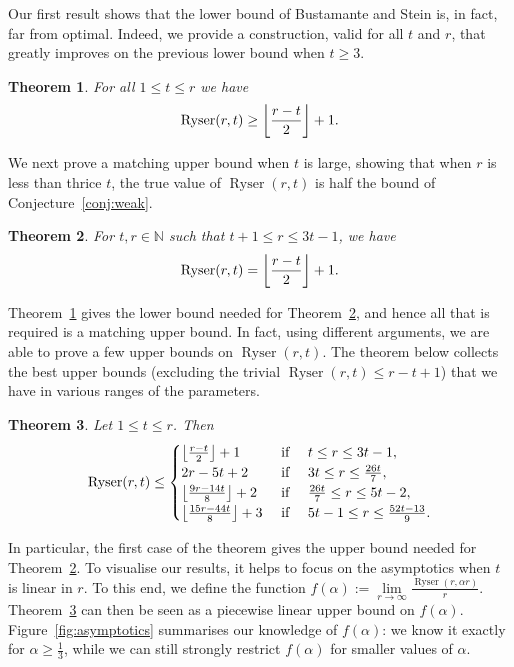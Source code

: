 \documentclass[a4paper,twoside,11pt]{article}
\DeclarePairedDelimiter{\floor}{\lfloor}{\rfloor}
\newtheorem{thm}{Theorem}
\numberwithin{thm}{section}
\theoremstyle{definition}
\theoremstyle{remark}
\theoremstyle{definition}
\DeclareMathOperator{\Ryser}{Ryser}
\begin{document}
Our first result shows that the lower bound of Bustamante and Stein is, in fact, far from optimal. Indeed, we provide a construction, valid for all $t$ and $r$, that greatly improves on the previous lower bound when $t\geq 3$.

\begin{thm} \label{thm:lowerbound}
For all $1 \le t \le r$ we have 
\[\Ryser(r,t)\geq \floor*{\frac{r-t}{2}}+1.\]
\end{thm}

We next prove a matching upper bound when $t$ is large, showing that when $r$ is less than thrice $t$, the true value of $\Ryser(r,t)$ is half the bound of Conjecture~\ref{conj:weak}.

\begin{thm} \label{thm:exactvalue}
For $t,r \in \mathbb{N}$ such that $t+1\leq r \leq  3t-1$, we have 
\[\Ryser(r,t)=\floor*{\frac{r-t}{2}}+1.\]
\end{thm}

Theorem~\ref{thm:lowerbound} gives the lower bound needed for Theorem~\ref{thm:exactvalue}, and hence all that is required is a matching upper bound. In fact, using different arguments, we are able to prove a few upper bounds on $\Ryser(r,t)$. The theorem below collects %
the best upper bounds (excluding the trivial $\Ryser(r,t) \le r-t+1$) that we have in various ranges of the parameters.

\begin{thm} \label{thm:upperbound}
Let $1 \le t \le r$. Then 
\[\Ryser(r,t)\leq \begin{cases}
    \floor*{\frac{r-t}{2}}+1 & \mbox{ if }\quad t\leq r \leq 3t-1, \\
    2r-5t+2 & \mbox{ if }\quad 3t \leq r \le \frac{26t}{7}, \\
    \floor*{\frac{9r-14t}{8}}+2 & \mbox{ if }\quad \frac{26t}{7} \leq r \leq 5t-2, \\
    \floor*{\frac{15r-44t}{8}}+3 & \mbox{ if }\quad 5t-1\leq r \leq \frac{52t-13}{9}. 
\end{cases}\]
\end{thm}

In particular, the first case of the theorem gives the upper bound needed for Theorem~\ref{thm:exactvalue}. To visualise our results, it helps to focus on the asymptotics when $t$ is linear in $r$. To this end,  we define the function $f(\alpha) := \lim\limits_{r \rightarrow \infty} \frac{\Ryser(r,\alpha r)}{r}$. Theorem~\ref{thm:upperbound} can then be seen as a piecewise linear upper bound on $f(\alpha)$. 
Figure~\ref{fig:asymptotics} summarises our knowledge of $f(\alpha)$: we know it exactly for $\alpha \ge \frac13$, while we can still strongly restrict $f(\alpha)$ for smaller values of $\alpha$.
\end{document}
